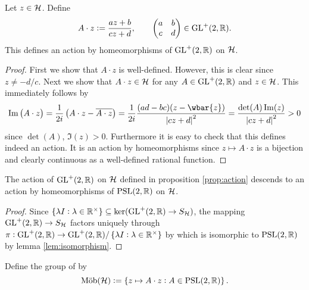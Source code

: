 \begin{proposition}
	Let $z \in \mathcal{H}$. Define 
	\begin{equation}
		A \cdot z := \frac{az + b}{cz + d}, \qquad \begin{pmatrix}
			a & b\\
			c & d
		\end{pmatrix} \in \mathrm{GL}^+(2,\mathbb{R}).
	\end{equation}
	This defines an action by homeomorphisms of $\mathrm{GL}^+(2,\mathbb{R})$ on $\mathcal{H}$.
	\label{prop:action}
\end{proposition}

\begin{proof}
	First we show that $A \cdot z$ is well-defined. However, this is clear since $z \neq -d/c$. Next we show that $A \cdot z \in \mathcal{H}$ for any $A \in \mathrm{GL}^+(2,\mathbb{R})$ and $z \in \mathcal{H}$. This immediately follows by
	\begin{equation}
\Im\del[1]{A \cdot z} = \frac{1}{2i}\del[1]{A \cdot z - \overline{A \cdot z}} = \frac{1}{2i}\frac{(ad - bc)(z - \wbar{z})}{\abs[0]{cz + d}^2} = \frac{\det(A)\Im(z)}{\abs[0]{cz + d}^2} > 0
		\label{eq:imaginary_part}
	\end{equation}
	\noindent since $\det(A)$, $\Im(z) > 0$. Furthermore it is easy to check that this defines indeed an action. It is an action by homeomorphisms since $z \mapsto A \cdot z$ is a bijection and clearly continuous as a well-defined rational function. 
\end{proof}

\begin{corollary}
	The action of $\mathrm{GL}^+(2,\mathbb{R})$ on $\mathcal{H}$ defined in proposition \ref{prop:action} descends to an action by homeomorphisms of $\mathrm{PSL}(2,\mathbb{R})$ on $\mathcal{H}$.
\end{corollary}

\begin{proof}
	Since $\cbr[0]{\lambda I : \lambda \in \Rbb^\times} \subseteq \ker(\GLrm^+(2,\Rbb) \to S_\Hcal)$, the mapping $\mathrm{GL}^+(2,\mathbb{R}) \to S_{\mathcal{H}}$ factors uniquely through $\pi : \GLrm^+(2,\Rbb) \to \GLrm^+(2,\Rbb)/\cbr[0]{\lambda I : \lambda \in \Rbb^\times}$ by \cite[23]{grillet:abstract_algebra:2007} which is isomorphic to $\mathrm{PSL}(2,\mathbb{R})$ by lemma \ref{lem:isomorphism}.	
\end{proof}

\begin{definition}
	Define the group of  by
	\begin{equation}
		\Mob(\Hcal) := \cbr[0]{z \mapsto A \cdot z : A \in \PSLrm(2,\Rbb)}.
	\end{equation}
\end{definition}

